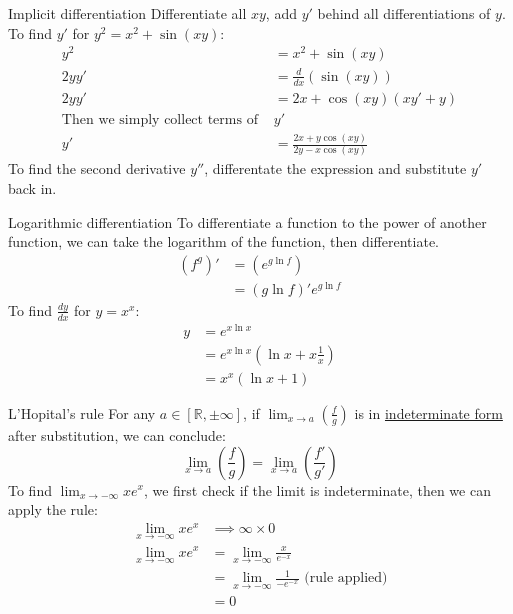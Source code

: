 \begin{knBox}
    {Implicit differentiation}
    Differentiate all $xy$, add $y'$ behind all differentiations of $y$.
    \tcblower
    To find $y'$ for $y^2=x^2+\sin(xy)$:
    \begin{align*}
        y^2                                     & =x^2+\sin(xy)                      \\
        2yy'                                    & =\frac{d}{dx}(\sin(xy))            \\
        2yy'                                    & =2x+\cos(xy)(xy'+y)                \\
        \text{Then we simply collect terms of } & y'                                 \\
        y'                                      & =\frac{2x+y\cos(xy)}{2y-x\cos(xy)}
    \end{align*}
    To find the second derivative $y''$, differentate the expression and substitute $y'$ back in.
\end{knBox}
\begin{knBox}
    {Logarithmic differentiation}
    To differentiate a function to the power of another function, we can take the logarithm of the function, then differentiate.
    \begin{align*}
        (f^g)'&=(e^{g\ln f}) \\
        & = (g\ln f)'e^{g\ln f}
    \end{align*}
    \tcblower
    To find $\frac{dy}{dx}$ for $y=x^x$:
    \begin{align*}
        y & =  e^{x\ln x} \\
         & = e^{x\ln x}(\ln x+x\frac{1}{x}) \\
            & = x^x(\ln x+1)
    \end{align*}
\end{knBox}
\label{sec:lhr}
\begin{theorem}
    {L'Hopital's rule}
    For any $a\in [\mathds{R}, \pm\infty]$, if $\lim_{x\to a}(\frac{f}{g})$ is in \hyperref[sec:indeterminate]{indeterminate form} after substitution, we can conclude:
    \[\lim_{x\to a}(\frac{f}{g})=\lim_{x\to a}(\frac{f'}{g'})\]
    \tcblower
    To find $\lim_{x\to-\infty}xe^x$, we first check if the limit is indeterminate, then we can apply the rule:
    \begin{align*}
        \lim_{x\to-\infty}xe^x & \implies \infty\times0                                      \\
        \lim_{x\to-\infty}xe^x & = \lim_{x\to-\infty}\frac{x}{e^{-x}}                        \\
                               & = \lim_{x\to-\infty}\frac{1}{-e^{-x}}\text{ (rule applied)} \\
                               & = 0
    \end{align*}
\end{theorem}


